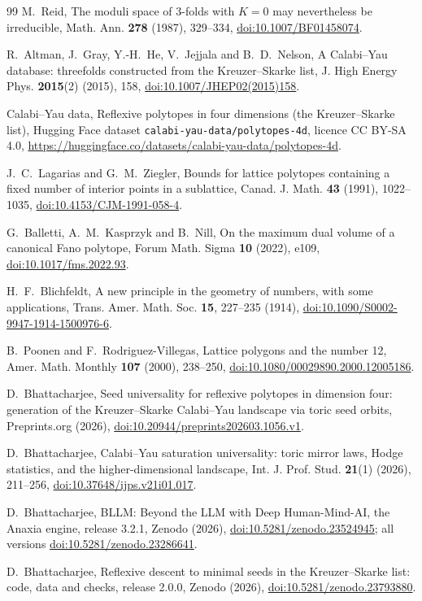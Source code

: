 \documentclass[11pt]{amsart}
\theoremstyle{definition}
\theoremstyle{remark}
\newcommand{\seedRelease}{2.0.0}
\newcommand{\seedDOI}{10.5281/zenodo.23793880}
\begin{document}
\begin{thebibliography}{99}
M.~Reid, The moduli space of 3-folds with $K=0$ may nevertheless be
irreducible, Math. Ann. \textbf{278} (1987), 329--334,
\href{https://doi.org/10.1007/BF01458074}{doi:10.1007/BF01458074}.

R.~Altman, J.~Gray, Y.-H.~He, V.~Jejjala and B.~D.~Nelson, A Calabi--Yau
database: threefolds constructed from the Kreuzer--Skarke list, J. High
Energy Phys. \textbf{2015}(2) (2015), 158,
\href{https://doi.org/10.1007/JHEP02(2015)158}{doi:10.1007/JHEP02(2015)158}.

Calabi--Yau data, Reflexive polytopes in four dimensions (the
Kreuzer--Skarke list), Hugging Face dataset
\texttt{calabi-yau-data/polytopes-4d}, licence CC BY-SA 4.0,
\url{https://huggingface.co/datasets/calabi-yau-data/polytopes-4d}.

J.~C.~Lagarias and G.~M.~Ziegler, Bounds for lattice polytopes containing
a fixed number of interior points in a sublattice, Canad. J. Math.
\textbf{43} (1991), 1022--1035,
\href{https://doi.org/10.4153/CJM-1991-058-4}{doi:10.4153/CJM-1991-058-4}.

G.~Balletti, A.~M.~Kasprzyk and B.~Nill, On the maximum dual volume of a
canonical Fano polytope, Forum Math. Sigma \textbf{10} (2022), e109,
\href{https://doi.org/10.1017/fms.2022.93}{doi:10.1017/fms.2022.93}.

H.~F.~Blichfeldt, A new principle in the geometry of numbers, with some
applications, Trans. Amer. Math. Soc. \textbf{15}, 227--235 (1914),
\href{https://doi.org/10.1090/S0002-9947-1914-1500976-6}{doi:10.1090/S0002-9947-1914-1500976-6}.

B.~Poonen and F.~Rodriguez-Villegas, Lattice polygons and the number 12,
Amer. Math. Monthly \textbf{107} (2000), 238--250,
\href{https://doi.org/10.1080/00029890.2000.12005186}{doi:10.1080/00029890.2000.12005186}.

D.~Bhattacharjee, Seed universality for reflexive polytopes in dimension
four: generation of the Kreuzer--Skarke Calabi--Yau landscape via toric
seed orbits, Preprints.org (2026),
\href{https://doi.org/10.20944/preprints202603.1056.v1}{doi:10.20944/preprints202603.1056.v1}.

D.~Bhattacharjee, Calabi--Yau saturation universality: toric mirror laws,
Hodge statistics, and the higher-dimensional landscape, Int. J. Prof.
Stud. \textbf{21}(1) (2026), 211--256,
\href{https://doi.org/10.37648/ijps.v21i01.017}{doi:10.37648/ijps.v21i01.017}.

D.~Bhattacharjee, BLLM: Beyond the LLM with Deep Human-Mind-AI, the Anaxia
engine, release 3.2.1, Zenodo (2026),
\href{https://doi.org/10.5281/zenodo.23524945}{doi:10.5281/zenodo.23524945};
all versions
\href{https://doi.org/10.5281/zenodo.23286641}{doi:10.5281/zenodo.23286641}.

D.~Bhattacharjee, Reflexive descent to minimal seeds in the
Kreuzer--Skarke list: code, data and checks, release \seedRelease, Zenodo
(2026), \href{https://doi.org/\seedDOI}{doi:\seedDOI}.

\end{thebibliography}
\endgroup
\end{document}
